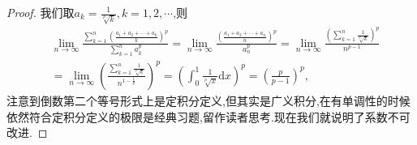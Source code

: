 \documentclass[../../main.tex]{subfiles}%
\begin{document}
\begin{proof}
我们取$a_k=\frac{1}{\sqrt[p]{k}},k=1,2,\cdots$,则
\begin{align*}
&\lim\limits_{n\to\infty}\frac{\sum\limits_{k=1}^n\left( \frac{a_1+a_2+\cdots+a_k}{k} \right)^p}{\sum\limits_{k=1}^n a_k^p} = \lim\limits_{n\to\infty}\frac{\left( \frac{a_1+a_2+\cdots+a_n}{n} \right)^p}{a_n^p} = \lim\limits_{n\to\infty}\frac{\left( \sum\limits_{k=1}^n \frac{1}{\sqrt[p]{k}} \right)^p}{n^{p-1}} \\
&= \lim\limits_{n\to\infty}\left( \frac{\sum\limits_{k=1}^n \frac{1}{\sqrt[p]{k}}}{n^{1-\frac{1}{p}}} \right)^p = \left( \int_0^1 \frac{1}{\sqrt[p]{x}} \mathrm{d}x \right)^p = \left( \frac{p}{p-1} \right)^p,
\end{align*}
注意到倒数第二个等号形式上是定积分定义,但其实是广义积分,在有单调性的时候依然符合定积分定义的极限是经典习题,留作读者思考.现在我们就说明了系数不可改进.


\end{proof}
\end{document}
